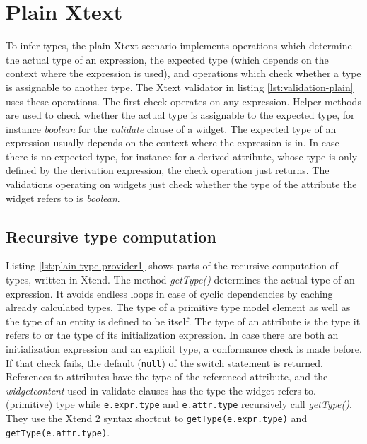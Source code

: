 \section{Plain Xtext}

To infer types, the plain Xtext scenario implements operations which determine
the actual type of an expression, the expected type (which depends on the
context where the expression is used), and operations which check whether a type
is assignable to another type. The Xtext validator in listing
\ref{lst:validation-plain} uses these operations. The first check operates on
any expression. Helper methods are used to check whether the actual type is
assignable to the expected type, for instance \emph{boolean} for the
\emph{validate} clause of a widget. The expected type of an expression usually
depends on the context where the expression is in. In case there is no expected
type, for instance for a derived attribute, whose type is only defined by the
derivation expression, the check operation just returns. The validations
operating on widgets just check whether the type of the attribute the widget
refers to is \emph{boolean}.




\subsection{Recursive type computation}

Listing \ref{lst:plain-type-provider1} shows parts of the recursive computation
of types, written in Xtend. The method \emph{getType()} determines the actual
type of an expression. It avoids endless loops in case of cyclic dependencies by
caching already calculated types. The type of a primitive type model element as
well as the type of an entity is defined to be itself. The type of an attribute
is the type it refers to or the type of its initialization expression. In case
there are both an initialization expression and an explicit type, a conformance
check is made before. If that check fails, the default (\verb|null|) of the
switch statement is returned. References to attributes have the type of the
referenced attribute, and the \emph{widgetcontent} used in validate clauses has
the type the widget refers to. %
(primitive) type while \verb|e.expr.type| and \verb|e.attr.type| recursively
call \emph{getType()}. They use the Xtend 2 syntax shortcut to
\verb|getType(e.expr.type)| and \verb|getType(e.attr.type)|.

